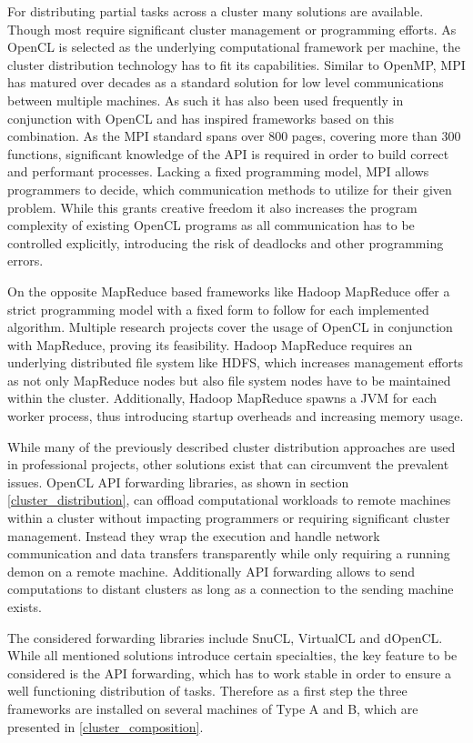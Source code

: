 For distributing partial tasks across a cluster many solutions are available. Though most require significant cluster management or programming efforts. As OpenCL is selected as the underlying computational framework per machine, the cluster distribution technology has to fit its capabilities.
Similar to OpenMP, MPI has matured over decades as a standard solution for low level communications between multiple machines. As such it has also been used frequently in conjunction with OpenCL and has inspired frameworks based on this combination. As the MPI standard spans over 800 pages, covering more than 300 functions\cite{mpi_spec}, significant knowledge of the API is required in order to build correct and performant processes. Lacking a fixed programming model, MPI allows programmers to decide, which communication methods to utilize for their given problem. While this grants creative freedom it also increases the program complexity of existing OpenCL programs as all communication has to be controlled explicitly, introducing the risk of deadlocks and other programming errors.

On the opposite MapReduce based frameworks like Hadoop MapReduce offer a strict programming model with a fixed form to follow for each implemented algorithm. Multiple research projects cover the usage of OpenCL in conjunction with MapReduce, proving its feasibility\cite{hadoopcl}\cite{hadoop+}. Hadoop MapReduce requires an underlying distributed file system like HDFS, which increases management efforts as not only MapReduce nodes but also file system nodes have to be maintained within the cluster. Additionally, Hadoop MapReduce spawns a JVM for each worker process, thus introducing startup overheads and increasing memory usage.

While many of the previously described cluster distribution approaches are used in professional projects, other solutions exist that can circumvent the prevalent issues. OpenCL API forwarding libraries, as shown in section \ref{cluster_distribution}, can offload computational workloads to remote machines within a cluster without impacting programmers or requiring significant cluster management. Instead they wrap the execution and handle network communication and data transfers transparently while only requiring a running demon on a remote machine. Additionally API forwarding allows to send computations to distant clusters as long as a connection to the sending machine exists.

The considered forwarding libraries include SnuCL, VirtualCL and dOpenCL. While all mentioned solutions introduce certain specialties, the key feature to be considered is the API forwarding, which has to work stable in order to ensure a well functioning distribution of tasks. Therefore as a first step the three frameworks are installed on several machines of Type A and B, which are presented in \ref{cluster_composition}.

